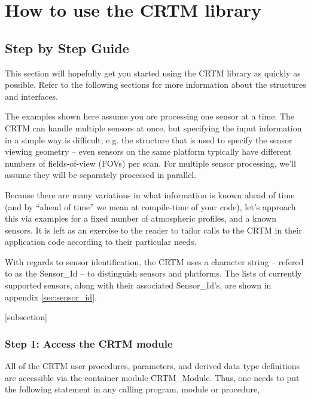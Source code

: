 \chapter{How to use the CRTM library}
\section{Step by Step Guide}
This section will hopefully get you started using the CRTM library as quickly as possible. Refer to the following sections for more information about the structures and interfaces.

The examples shown here assume you are processing one sensor at a time. The CRTM can handle multiple sensors at once, but specifying the input information in a simple way is difficult; e.g. the \hyperref[sec:geometryinfo_structure]{\GeometryInfo} structure that is used to specify the sensor viewing geometry -- even sensors on the same platform typically have different numbers of fields-of-view (FOVs) per scan. For multiple sensor processing, we'll assume they will be separately processed in parallel.

Because there are many variations in what information is known ahead of time (and by ``ahead of time'' we mean at compile-time of your code), let's approach this via examples for a fixed number of atmospheric profiles, and a known sensors. It is left as an exercise to the reader to tailor calls to the CRTM in their application code according to their particular needs.

With regards to sensor identification, the CRTM uses a character string -- refered to as the \f{Sensor\_Id} -- to distinguish sensors and platforms. The lists of currently supported sensors, along with their associated \f{Sensor\_Id}'s, are shown in appendix \ref{sec:sensor_id}.


[subsection]

\subsection{Step 1: Access the CRTM module}
\label{sec:access_step}
All of the CRTM user procedures, parameters, and derived data type definitions are accessible via the container module \f{CRTM\_Module}. Thus, one needs to put the following statement in any calling program, module or procedure,

